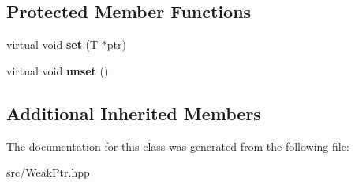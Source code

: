 \subsection*{Protected Member Functions}
\begin{DoxyCompactItemize}
\item 
\mbox{\label{classathome_1_1utility_1_1memory_1_1_weak_ptr_aa4602622ac8373038570ed15c78a5ad7}} 
virtual void {\bfseries set} (T $\ast$ptr)
\item 
\mbox{\label{classathome_1_1utility_1_1memory_1_1_weak_ptr_a99ad3f7d8dca6c1019195d9e9d8d80c6}} 
virtual void {\bfseries unset} ()
\end{DoxyCompactItemize}
\subsection*{Additional Inherited Members}


The documentation for this class was generated from the following file\+:\begin{DoxyCompactItemize}
\item 
src/Weak\+Ptr.\+hpp\end{DoxyCompactItemize}
